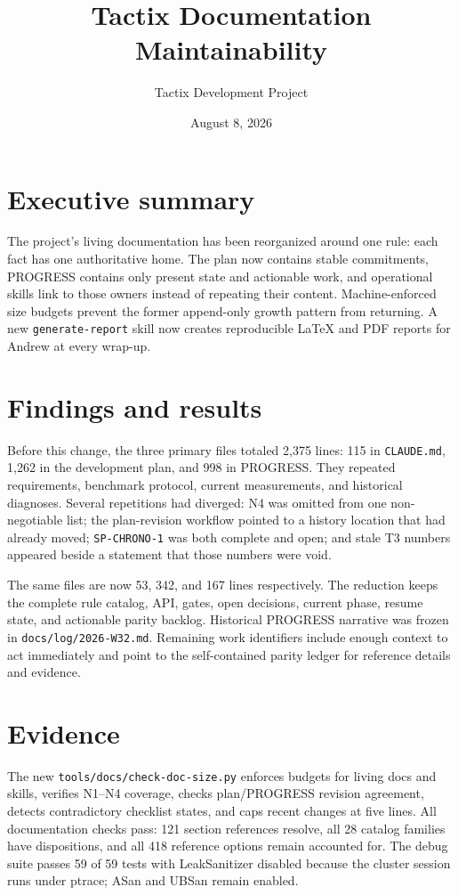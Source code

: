 \documentclass[11pt]{article}
\title{Tactix Documentation Maintainability}
\author{Tactix Development Project}
\date{August 8, 2026}
\begin{document}
\maketitle

\section*{Executive summary}
The project's living documentation has been reorganized around one rule: each
fact has one authoritative home. The plan now contains stable commitments,
PROGRESS contains only present state and actionable work, and operational skills
link to those owners instead of repeating their content. Machine-enforced size
budgets prevent the former append-only growth pattern from returning. A new
\texttt{generate-report} skill now creates reproducible LaTeX and PDF reports
for Andrew at every wrap-up.

\section{Findings and results}
Before this change, the three primary files totaled 2,375 lines: 115 in
\texttt{CLAUDE.md}, 1,262 in the development plan, and 998 in PROGRESS. They
repeated requirements, benchmark protocol, current measurements, and historical
diagnoses. Several repetitions had diverged: N4 was omitted from one
non-negotiable list; the plan-revision workflow pointed to a history location
that had already moved; \texttt{SP-CHRONO-1} was both complete and open; and
stale T3 numbers appeared beside a statement that those numbers were void.

The same files are now 53, 342, and 167 lines respectively. The reduction keeps
the complete rule catalog, API, gates, open decisions, current phase, resume
state, and actionable parity backlog. Historical PROGRESS narrative was frozen
in \texttt{docs/log/2026-W32.md}. Remaining work identifiers include enough
context to act immediately and point to the self-contained parity ledger for
reference details and evidence.

\section{Evidence}
The new \texttt{tools/docs/check-doc-size.py} enforces budgets for living docs
and skills, verifies N1--N4 coverage, checks plan/PROGRESS revision agreement,
detects contradictory checklist states, and caps recent changes at five lines.
All documentation checks pass: 121 section references resolve, all 28 catalog
families have dispositions, and all 418 reference options remain accounted for.
The debug suite passes 59 of 59 tests with LeakSanitizer disabled because the
cluster session runs under ptrace; ASan and UBSan remain enabled.
\end{document}
